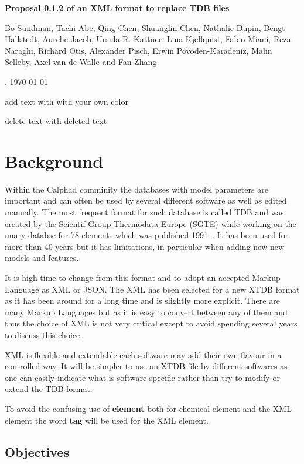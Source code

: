 \documentclass{article}
\begin{document}
\begin{center}

  {\Large \bf Proposal 0.1.2 of an XML format to replace TDB files}


  Bo Sundman, Tachi Abe, Qing Chen, Shuanglin Chen, Nathalie Dupin,
  Bengt Hallstedt, Aurelie Jacob, Ursula R. Kattner, Lina Kjellquist,
  Fabio Miani, Reza Naraghi, Richard Otis, Alexander Pisch, Erwin
  Povoden-Karadeniz, Malin Selleby, Axel van de Walle and Fan Zhang

. \today

\end{center}

add text with {\color{red} with your own color}

delete text with \sout{deleted text}

\section{Background}

Within the Calphad comminity the databases with model parameters are
important and can often be used by several different software as well
as edited manually.  The most frequent format for such database is
called TDB and was created by the Scientif Group Thermodata Europe
(SGTE) while working on the unary databse for 78 elements which was
published 1991~\cite{91Din}.  It has been used for more than 40 years
but it has limitations, in particular when adding new new models and
features.

It is high time to change from this format and to adopt an accepted
Markup Language as XML or JSON.  The XML has been selected for a new
XTDB format as it has been around for a long time and is slightly more
explicit.  There are many Markup Languages but as it is easy to
convert between any of them and thus the choice of XML is not very
critical except to avoid spending several years to discuss this
choice.

XML is flexible and extendable each software may add their own flavour
in a controlled way.  It will be simpler to use an XTDB file by
different softwares as one can easily indicate what is software
specific rather than try to modify or extend the TDB format.

To avoid the confusing use of {\bf element} both for chemical element
and the XML element the word {\bf tag} will be used for the XML
element.

\subsection{Objectives}
\end{document}
